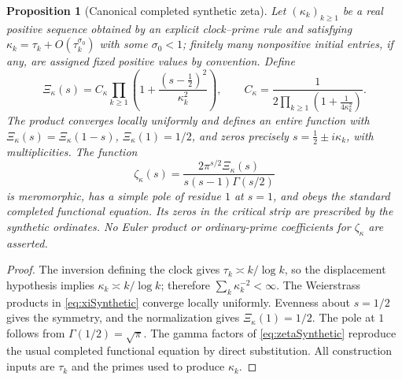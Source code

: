 \documentclass[11pt,reqno]{amsart}
\numberwithin{equation}{section}
\newtheorem{proposition}[theorem]{Proposition}
\begin{document}
\begin{proposition}[Canonical completed synthetic zeta]
\label{prop:xiSynthetic}
Let $(\kappa_k)_{k\ge1}$ be a real positive sequence obtained by
an explicit clock--prime rule and satisfying
$\kappa_k=\tau_k+O(\tau_k^{\sigma_0})$ with some
$\sigma_0<1$; finitely many nonpositive initial entries, if any,
are assigned fixed positive values by convention. Define
\begin{equation}\label{eq:xiSynthetic}
\Xi_{\kappa}(s)=C_{\kappa}\prod_{k\ge1}
\left(1+\frac{(s-\tfrac12)^2}{\kappa_k^2}\right),\qquad
C_{\kappa}=\frac1{2\displaystyle\prod_{k\ge1}
(1+\frac1{4\kappa_k^2})}.
\end{equation}
The product converges locally uniformly and defines an entire
function with $\Xi_{\kappa}(s)=\Xi_{\kappa}(1-s)$,
$\Xi_{\kappa}(1)=1/2$, and zeros precisely
$s=\tfrac12\pm i\kappa_k$, with multiplicities.
The function
\begin{equation}\label{eq:zetaSynthetic}
\zeta_{\kappa}(s)=
\frac{2\pi^{s/2}\Xi_{\kappa}(s)}
{s(s-1)\Gamma(s/2)}
\end{equation}
is meromorphic, has a simple pole of residue $1$ at $s=1$,
and obeys the standard \emph{completed} functional equation.
Its zeros in the critical strip are prescribed by the synthetic
ordinates. No Euler product or ordinary-prime coefficients for
$\zeta_{\kappa}$ are asserted.
\end{proposition}
\begin{proof}
The inversion defining the clock gives $\tau_k\asymp k/\log k$,
so the displacement hypothesis implies $\kappa_k\asymp k/\log k$;
therefore $\sum_k\kappa_k^{-2}<\infty$.
The Weierstrass products in \eqref{eq:xiSynthetic} converge
locally uniformly. Evenness about $s=1/2$ gives the symmetry,
and the normalization gives $\Xi_\kappa(1)=1/2$.
The pole at $1$ follows from $\Gamma(1/2)=\sqrt\pi$.
The gamma factors of \eqref{eq:zetaSynthetic} reproduce the
usual completed functional equation by direct substitution.
All construction inputs are $\tau_k$ and the primes used to
produce $\kappa_k$.
\end{proof}
\end{document}
